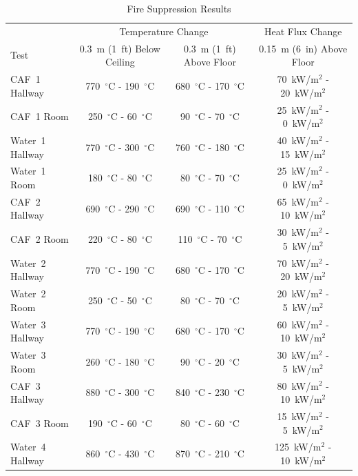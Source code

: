 \documentclass[12pt,oneside]{book}
\begin{document}
\begin{table}[!ht]
\centering
\caption{Fire Suppression Results}\label{tab:Test_Results}
\begin{tabular}{lccc}
\toprule[1.5pt]
                 & \multicolumn{2}{c}{Temperature Change}                                    & Heat Flux Change \\
Test 	         & 0.3~m (1~ft) Below Ceiling          & 0.3~m (1~ft) Above Floor	         & 0.15~m (6~in) Above Floor \\
\midrule
CAF~1 Hallway    & 770~$^{\circ}$C - 190~$^{\circ}$C   & 680~$^{\circ}$C - 170~$^{\circ}$C   & 70~kW/m$^2$ - 20~kW/m$^2$  \\
CAF~1 Room       & 250~$^{\circ}$C - 60~$^{\circ}$C    & 90~$^{\circ}$C - 70~$^{\circ}$C     & 25~kW/m$^2$ - 0~kW/m$^2$  \\ [.25cm]
Water~1 Hallway  & 770~$^{\circ}$C - 300~$^{\circ}$C   & 760~$^{\circ}$C - 180~$^{\circ}$C   & 40~kW/m$^2$ - 15~kW/m$^2$  \\
Water~1 Room     & 180~$^{\circ}$C - 80~$^{\circ}$C    & 80~$^{\circ}$C - 70~$^{\circ}$C     & 25~kW/m$^2$ - 0~kW/m$^2$  \\ [.25cm]
CAF~2 Hallway    & 690~$^{\circ}$C - 290~$^{\circ}$C   & 690~$^{\circ}$C - 110~$^{\circ}$C   & 65~kW/m$^2$ - 10~kW/m$^2$  \\
CAF~2 Room       & 220~$^{\circ}$C - 80~$^{\circ}$C    & 110~$^{\circ}$C - 70~$^{\circ}$C    & 30~kW/m$^2$ - 5~kW/m$^2$  \\ [.25cm]
Water~2 Hallway  & 770~$^{\circ}$C - 190~$^{\circ}$C   & 680~$^{\circ}$C - 170~$^{\circ}$C   & 70~kW/m$^2$ - 20~kW/m$^2$  \\
Water~2 Room     & 250~$^{\circ}$C - 50~$^{\circ}$C    & 80~$^{\circ}$C - 70~$^{\circ}$C     & 20~kW/m$^2$ - 5~kW/m$^2$  \\ [.25cm]
Water~3 Hallway  & 770~$^{\circ}$C - 190~$^{\circ}$C   & 680~$^{\circ}$C - 170~$^{\circ}$C   & 60~kW/m$^2$ - 10~kW/m$^2$  \\
Water~3 Room     & 260~$^{\circ}$C - 180~$^{\circ}$C   & 90~$^{\circ}$C - 20~$^{\circ}$C     & 30~kW/m$^2$ - 5~kW/m$^2$  \\ [.25cm]
CAF~3 Hallway    & 880~$^{\circ}$C - 300~$^{\circ}$C   & 840~$^{\circ}$C - 230~$^{\circ}$C   & 80~kW/m$^2$ - 10~kW/m$^2$  \\
CAF~3 Room       & 190~$^{\circ}$C - 60~$^{\circ}$C    & 80~$^{\circ}$C - 60~$^{\circ}$C     & 15~kW/m$^2$ - 5~kW/m$^2$  \\ [.25cm]
Water~4 Hallway  & 860~$^{\circ}$C - 430~$^{\circ}$C   & 870~$^{\circ}$C - 210~$^{\circ}$C   & 125~kW/m$^2$ - 10~kW/m$^2$  \\

\end{tabular}
\end{table}
\end{document}
